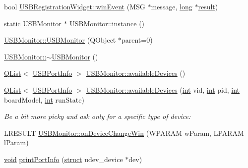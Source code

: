 \begin{DoxyCompactItemize}
bool \hyperlink{group___raw_h_i_d_plugin_gacce70fd01437c66b524cc2f512ceece6}{U\-S\-B\-Registration\-Widget\-::win\-Event} (M\-S\-G $\ast$message, \hyperlink{ioapi_8h_a3c7b35ad9dab18b8310343c201f7b27e}{long} $\ast$\hyperlink{qxtslotjob_8h_aab161efab0511ea9612b64c40e9852ca}{result})
\item 
static \hyperlink{class_u_s_b_monitor}{U\-S\-B\-Monitor} $\ast$ \hyperlink{group___raw_h_i_d_plugin_gabcb44085db71f0bd0a1513d25a572b33}{U\-S\-B\-Monitor\-::instance} ()
\item 
\hyperlink{group___raw_h_i_d_plugin_ga1de6bdbd3deee4991e3b910e6d274121}{U\-S\-B\-Monitor\-::\-U\-S\-B\-Monitor} (Q\-Object $\ast$parent=0)
\item 
\hyperlink{group___raw_h_i_d_plugin_ga0a472129bd25e3c7972ce78ca52ed19d}{U\-S\-B\-Monitor\-::$\sim$\-U\-S\-B\-Monitor} ()
\item 
\hyperlink{class_q_list}{Q\-List}$<$ \hyperlink{struct_u_s_b_port_info}{U\-S\-B\-Port\-Info} $>$ \hyperlink{group___raw_h_i_d_plugin_gaf7da3cc1fc2b9085f5647f0d3822ade1}{U\-S\-B\-Monitor\-::available\-Devices} ()
\item 
\hyperlink{class_q_list}{Q\-List}$<$ \hyperlink{struct_u_s_b_port_info}{U\-S\-B\-Port\-Info} $>$ \hyperlink{group___raw_h_i_d_plugin_ga8b0ce433f3d1f5907b290b1f4185984d}{U\-S\-B\-Monitor\-::available\-Devices} (\hyperlink{ioapi_8h_a787fa3cf048117ba7123753c1e74fcd6}{int} vid, \hyperlink{ioapi_8h_a787fa3cf048117ba7123753c1e74fcd6}{int} pid, \hyperlink{ioapi_8h_a787fa3cf048117ba7123753c1e74fcd6}{int} board\-Model, \hyperlink{ioapi_8h_a787fa3cf048117ba7123753c1e74fcd6}{int} run\-State)
\begin{DoxyCompactList}\small\item\em Be a bit more picky and ask only for a specific type of device\-: \end{DoxyCompactList}\item 
L\-R\-E\-S\-U\-L\-T \hyperlink{group___raw_h_i_d_plugin_ga108b55e821dbc91874e52cdb7cb71150}{U\-S\-B\-Monitor\-::on\-Device\-Change\-Win} (W\-P\-A\-R\-A\-M w\-Param, L\-P\-A\-R\-A\-M l\-Param)
\item 
\hyperlink{group___u_a_v_objects_plugin_ga444cf2ff3f0ecbe028adce838d373f5c}{void} \hyperlink{group___raw_h_i_d_plugin_ga8674891a6b7805cdda191e41eee8f67f}{print\-Port\-Info} (\hyperlink{sdlgamepad_8dox_aba655c5729da86df745f0c8e7f9ba8d2}{struct} udev\-\_\-device $\ast$dev)
\end{DoxyCompactItemize}
